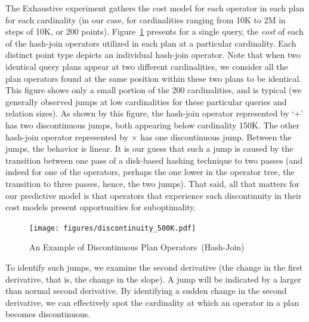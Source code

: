 \documentclass[prodmode,acmtods]{acmsmall}
\begin{document}
The Exhaustive experiment gathers the cost model for each operator in each
plan for each cardinality (in our case, for cardinalities ranging from 10K
to 2M in steps of 10K, or 200 points).  Figure~\ref{fig:discontinuity}
presents for a single query, the {\em cost} of each of the hash-join operators utilized in
each plan at a particular cardinality. Each distinct point type depicts an
individual hash-join operator. Note that when two identical query plans
appear at two different cardinalities, we consider all the plan operators
found at the same position within these two plans to be identical. This
figure shows only a small portion of the 200 cardinalities, and is typical
(we generally observed jumps at low cardinalities for these particular queries and
relation sizes).  As shown by this figure, the hash-join operator
represented by `+' has two discontinuous jumps, both appearing below
cardinality 150K. The other hash-join operator represented by $\times$ has one
discontinuous jump.  Between the jumps, the behavior is linear. It is our
guess that
such a jump is caused by the transition between one pass of a disk-based hashing
technique to two passes (and indeed for one of the operators, perhaps the one
lower in the operator tree, the transition to three passes, hence, the two
jumps). That said, all
that matters for our predictive model is that operators that experience
such discontinuity in their cost models present opportunities for
suboptimality.

\begin{figure}[t]
\centering
\texttt{[image: figures/discontinuity\_500K.pdf]}%
\caption{An Example of Discontinuous Plan \hbox{Operators (Hash-Join)}}
\label{fig:discontinuity}
\end{figure}

To identify such jumps, we examine the second derivative (the change in the
first derivative, that is, the change in the slope). A jump will be indicated by a larger than normal second
derivative. By identifying a sudden change in the second derivative, we can
effectively spot the cardinality at which an operator in a plan becomes
discontinuous.
\end{document}
